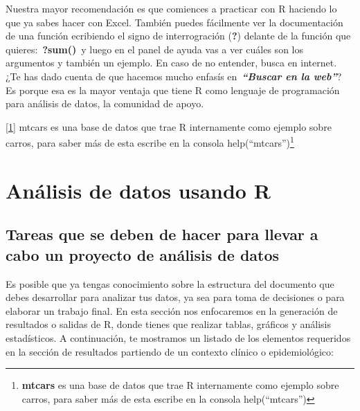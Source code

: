 \documentclass[
  letterpaper,
  DIV=11,
  numbers=noendperiod]{scrreprt}
\begin{document}
Nuestra mayor recomendación es que comiences a practicar con R haciendo
lo que ya sabes hacer con Excel. También puedes fácilmente ver la
documentación de una función ecribiendo el signo de interrogración
(\textbf{?}) delante de la función que quieres:~\textbf{?sum()}~y luego
en el panel de ayuda vas a ver cuáles son los argumentos y también un
ejemplo. En caso de no entender, busca en internet. ¿Te has dado cuenta
de que hacemos mucho enfasís en~\textbf{\emph{``Buscar en la web''}}? Es
porque esa es la mayor ventaja que tiene R como lenguaje de programación
para análisis de datos, la comunidad de apoyo.

\hyperref[_ftnref1]{{[}1{]}} mtcars es una base de datos que trae R
internamente como ejemplo sobre carros, para saber más de esta escribe
en la consola help(``mtcars'')\footnote{\textbf{mtcars} es una base de
  datos que trae R internamente como ejemplo sobre carros, para saber
  más de esta escribe en la consola help(``mtcars'')}


\chapter{Análisis de datos usando
R}\label{anuxe1lisis-de-datos-usando-r}

\section{Tareas que se deben de hacer para llevar a cabo un proyecto de
análisis de
datos}\label{tareas-que-se-deben-de-hacer-para-llevar-a-cabo-un-proyecto-de-anuxe1lisis-de-datos}

Es posible que ya tengas conocimiento sobre la estructura del documento
que debes desarrollar para analizar tus datos, ya sea para toma de
decisiones o para elaborar un trabajo final. En esta sección nos
enfocaremos en la generación de resultados o salidas de R, donde tienes
que realizar tablas, gráficos y análisis estadísticos. A continuación,
te mostramos un listado de los elementos requeridos en la sección de
resultados partiendo de un contexto clínico o epidemiológico:
\end{document}
